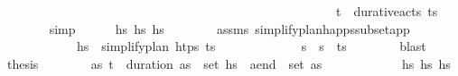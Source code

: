 \begin{isabellebody}
\ \ \ \ \ \ \ \ \ \ \ \ \ \ \ \ \ \ \ \ \ \ \ \ \ \ \ \ \ \ \ \ \ \ \ \ \ \ \ \ \ \ \ \ \ \ \ \ \ \ \ \ \ {\isacartoucheopen}{\isacharparenleft}{\kern0pt}t\isactrlsub {\isasympi}{\isacharcomma}{\kern0pt}{\isasympi}{\isacharparenright}{\kern0pt}\ {\isasymin}\ durative{\isacharunderscore}{\kern0pt}acts\ {\isacharparenleft}{\kern0pt}{\isacharparenleft}{\kern0pt}t\isactrlsub {\isasympi}{\isacharcomma}{\kern0pt}{\isasympi}{\isacharparenright}{\kern0pt}{\isacharhash}{\kern0pt}{\isasympi}s\ \isanewline
\ \ \ \ \ \ \isamarkupfalse%
\ simp\isanewline
\ \ \ \ \isamarkupfalse%
\ {\isachardoublequoteopen}hs{\isacharprime}{\kern0pt}\ {\isasymsubseteq}\isactrlsub h\isactrlsub s\ hs{\isachardoublequoteclose}\isanewline
\ \ \ \ \ \ \isamarkupfalse%
\ assms\ simplify{\isacharunderscore}{\kern0pt}plan{\isacharunderscore}{\kern0pt}happs{\isacharunderscore}{\kern0pt}subset{\isacharunderscore}{\kern0pt}app\ \isanewline
\ \ \ \ \ \ \ \ \ \ \ \ {\isacartoucheopen}hs{\isacharprime}{\kern0pt}\ {\isacharequal}{\kern0pt}\ simplify{\isacharunderscore}{\kern0pt}plan\ htps\ {\isacharparenleft}{\kern0pt}{\isacharparenleft}{\kern0pt}t\isactrlsub {\isasympi}{\isacharcomma}{\kern0pt}{\isasympi}{\isacharparenright}{\kern0pt}{\isacharhash}{\kern0pt}{\isasympi}s\ \isanewline
\ \ \ \ \ \ \ \ \ \ \ \ {\isacartoucheopen}{\isasympi}s\ {\isacharequal}{\kern0pt}\ {\isasympi}s\ {\isacharat}{\kern0pt}\ {\isacharparenleft}{\kern0pt}{\isacharparenleft}{\kern0pt}t\isactrlsub {\isasympi}{\isacharcomma}{\kern0pt}{\isasympi}{\isacharparenright}{\kern0pt}{\isacharhash}{\kern0pt}{\isasympi}s\isanewline
\ \ \ \ \ \ \isamarkupfalse%
\ blast\isanewline
\ \ \ \ \isamarkupfalse%
\ {\isacharquery}{\kern0pt}thesis\isanewline
\ \ \ \ \ \ \isamarkupfalse%
\ {\isacartoucheopen}{\isasymexists}as{\isachardot}{\kern0pt}\ {\isacharparenleft}{\kern0pt}t\isactrlsub {\isasympi}\ {\isacharplus}{\kern0pt}\ {\isacharparenleft}{\kern0pt}duration\ {\isasympi}{\isacharparenright}{\kern0pt}{\isacharcomma}{\kern0pt}as{\isacharparenright}{\kern0pt}\ {\isasymin}\ set\ hs{\isacharprime}{\kern0pt}\ {\isasymand}\ a\isactrlsub e\isactrlsub n\isactrlsub d\ {\isasymin}\ set\ as{\isacartoucheclose}\isanewline
\ \ \ \ \ \ \ \ \ \ \ \ {\isacartoucheopen}hs{\isacharprime}{\kern0pt}\ {\isasymsubseteq}\isactrlsub h\isactrlsub s\ hs{\isacartoucheclose}\isanewline

\end{isabellebody}
